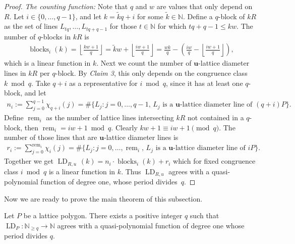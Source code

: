 \documentclass[11pt]{article}
\newcommand{\bu}{\mathbf{u}}
\newcommand{\N}{\mathbb{N}}
\DeclareMathOperator{\blocks}{blocks}
\DeclareMathOperator{\rem}{rem}
\DeclareMathOperator{\LD}{LD}
\newcommand{\lp}{\left(}
\newcommand{\rp}{\right)}
\begin{document}
\begin{proof}
    \textit{The counting function:} Note that $q$ and $w$ are values that only depend on $R$. Let $i \in \{0, \ldots, q-1\}$, and let $k=\tilde{k}q+i$ for some $\tilde{k} \in \N$. Define a $q$-block of $kR$ as the set of lines $L_{tq}, \ldots, L_{tq+q-1}$ for those $t \in \N$ for which $tq+q-1 \leq kw$. The number of $q$-blocks in $kR$ is
    \begin{align*}
         \blocks_i(k)  = \left \lfloor  \frac{kw+1}{q} \right\rfloor = \tilde{k}w + \left\lfloor \frac{iw+1}{q}\right\rfloor = \frac{wk}{q}  - \lp \frac{iw}{q} - \left\lfloor \frac{iw+1}{q} \right\rfloor \rp,
    \end{align*}
    which is a linear function in $k$. Next we count the number of $\bu$-lattice diameter lines in $kR$ per $q$-block. By \textit{Claim 3}, this only depends on the congruence class $k \bmod q$. Take $q+i$ as a representative for $i \bmod q$,
    since it has at least one $q$-block, and let
    \begin{align*}
        n_i := \sum_{j=0}^{q-1}\chi_{q+i}(j) = \# \{  L_j: j =0, \ldots, q-1,\, L_j \text{ is a $\bu$-lattice diameter line of } (q+i)P\}.
    \end{align*}
    Define $\rem_i$ as the number of lattice lines intersecting $kR$ not contained in a $q$-block, then $\rem_i= iw+1 \bmod q$. Clearly $kw +1 \equiv iw+1 \pmod q$. 
    The number of those lines that are $\bu$-lattice diameter lines is
    \begin{align*}
        r_i := \sum_{j=0}^{\rem_i} \chi_{i}(j)  = \# \{  L_j: j =0, \ldots, \rem_i, \, L_j \text{ is a $\bu$-lattice diameter line of } iP\}.
    \end{align*}
    Together we get $\LD_{R,u\,}(k) = n_i \cdot \blocks_{i}(k) + r_i$ which for fixed congruence class $ i \bmod q$ is a linear function in $k$. Thus $\LD_{R,u}$ agrees with a quasi-polynomial function of degree one, whose period \mbox{divides $q$}.
\end{proof}

Now we are ready to prove the main theorem of this subsection.

\begin{theorem}\label{thm:QP}
    Let $P$ be a lattice polygon. There exists a positive integer $q$ such that \mbox{$\LD_P: \N_{\geq q} \to \N$} agrees with a quasi-polynomial function of degree one whose period divides $q$.
\end{theorem}
\end{document}

